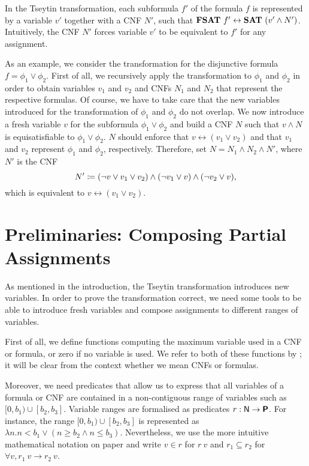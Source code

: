 In the Tseytin transformation, each subformula $f'$ of the formula $f$ is represented by a variable $v'$ together with a CNF $N'$, such that $\textbf{FSAT}{}~f' \leftrightarrow \textbf{SAT}{}~(v' \land N')$. Intuitively, the CNF $N'$ forces variable $v'$ to be equivalent to $f'$ for any assignment.
\begin{example}
  As an example, we consider the transformation for the disjunctive formula $f = \phi_1 \lor \phi_2$. First of all, we recursively apply the transformation to $\phi_1$ and $\phi_2$ in order to obtain variables $v_1$ and $v_2$ and CNFs $N_1$ and $N_2$ that represent the respective formulas. Of course, we have to take care that the new variables introduced for the transformation of $\phi_1$ and $\phi_2$ do not overlap.
  We now introduce a fresh variable $v$ for the subformula $\phi_1 \lor \phi_2$ and build a CNF $N$ such that $v \land N$ is equisatisfiable to $\phi_1 \lor \phi_2$. $N$ should enforce that $v \leftrightarrow (v_1 \lor v_2)$ and that $v_1$ and $v_2$ represent $\phi_1$ and $\phi_2$, respectively.
  Therefore, set $N = N_1 \land N_2 \land N'$, where $N'$ is the CNF 
  \[ N' \coloneqq (\lnot v \lor v_1 \lor v_2) \land (\lnot v_1  \lor v) \land (\lnot v_2 \lor v), \]
  which is equivalent to $v \leftrightarrow (v_1 \lor v_2)$.
\end{example}

\section{Preliminaries: Composing Partial Assignments}\label{sec:tseytin_prelim}
As mentioned in the introduction, the Tseytin transformation introduces new variables. In order to prove the transformation correct, we need some tools to be able to introduce fresh variables and compose assignments to different ranges of variables.

First of all, we define functions computing the maximum variable used in a CNF or formula, or zero if no variable is used. We refer to both of these functions by \mnotec{\maxVar{}}; it will be clear from the context whether we mean CNFs or formulas. 

\newcommand{\inlit}{\ensuremath{\in_{\textsf{lit}}}}
\newcommand{\inclause}{\ensuremath{\in_{\textsf{clause}}}}
\newcommand{\incnf}{\ensuremath{\in_{\textsf{cnf}}}}
\newcommand{\infor}{\ensuremath{\in_{\formula}}}
Moreover, we need predicates that allow us to express that all variables of a formula or CNF are contained in a non-contiguous range of variables such as $[0, b_1) \cup [b_2, b_3]$. 
Variable ranges are formalised as predicates $r : \mathsf{N} \rightarrow \textsf{\bfseries P}$. For instance, the range $[0, b_1) \cup [b_2, b_3]$ is represented as $\lambda n. n < b_1 \lor (n \ge b_2 \land n \le b_3)$. Nevertheless, we use the more intuitive mathematical notation on paper and write $v \in r$ for $r~v$ and $r_1 \subseteq r_2$ for $\forall v, r_1~v \rightarrow r_2~v$.


